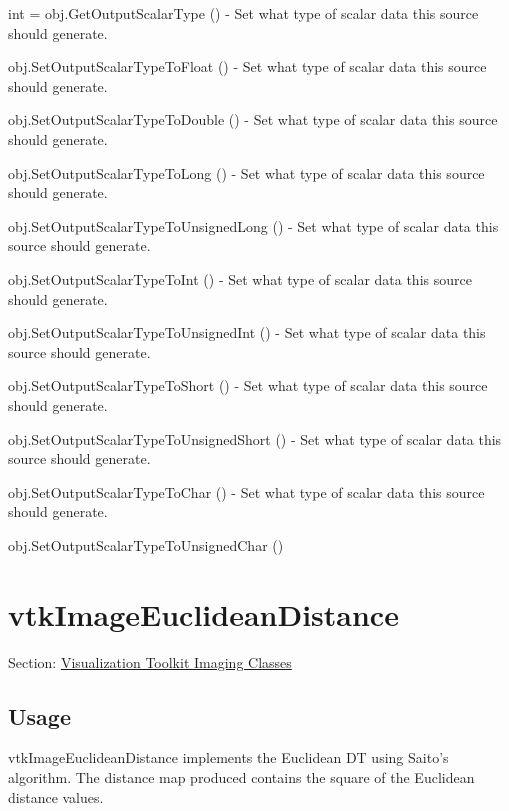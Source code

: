 \begin{DoxyItemize}
\item {\ttfamily int = obj.\-Get\-Output\-Scalar\-Type ()} -\/ Set what type of scalar data this source should generate.  
\item {\ttfamily obj.\-Set\-Output\-Scalar\-Type\-To\-Float ()} -\/ Set what type of scalar data this source should generate.  
\item {\ttfamily obj.\-Set\-Output\-Scalar\-Type\-To\-Double ()} -\/ Set what type of scalar data this source should generate.  
\item {\ttfamily obj.\-Set\-Output\-Scalar\-Type\-To\-Long ()} -\/ Set what type of scalar data this source should generate.  
\item {\ttfamily obj.\-Set\-Output\-Scalar\-Type\-To\-Unsigned\-Long ()} -\/ Set what type of scalar data this source should generate.  
\item {\ttfamily obj.\-Set\-Output\-Scalar\-Type\-To\-Int ()} -\/ Set what type of scalar data this source should generate.  
\item {\ttfamily obj.\-Set\-Output\-Scalar\-Type\-To\-Unsigned\-Int ()} -\/ Set what type of scalar data this source should generate.  
\item {\ttfamily obj.\-Set\-Output\-Scalar\-Type\-To\-Short ()} -\/ Set what type of scalar data this source should generate.  
\item {\ttfamily obj.\-Set\-Output\-Scalar\-Type\-To\-Unsigned\-Short ()} -\/ Set what type of scalar data this source should generate.  
\item {\ttfamily obj.\-Set\-Output\-Scalar\-Type\-To\-Char ()} -\/ Set what type of scalar data this source should generate.  
\item {\ttfamily obj.\-Set\-Output\-Scalar\-Type\-To\-Unsigned\-Char ()}  
\end{DoxyItemize}\hypertarget{vtkimaging_vtkimageeuclideandistance}{}\section{vtk\-Image\-Euclidean\-Distance}\label{vtkimaging_vtkimageeuclideandistance}
Section\-: \hyperlink{sec_vtkimaging}{Visualization Toolkit Imaging Classes} \hypertarget{vtkwidgets_vtkxyplotwidget_Usage}{}\subsection{Usage}\label{vtkwidgets_vtkxyplotwidget_Usage}
vtk\-Image\-Euclidean\-Distance implements the Euclidean D\-T using Saito's algorithm. The distance map produced contains the square of the Euclidean distance values.

